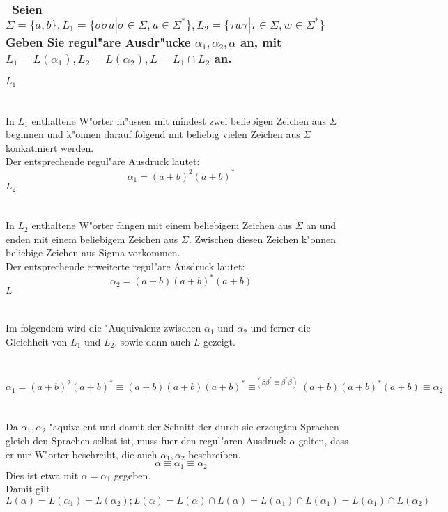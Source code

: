 \documentclass{article}
\newcommand{\gap}{\null\ \\ \\}
\newcommand{\task}[1]{\textbf{#1} \\ \gap}
\begin{document}
\subsubsection{\
    Seien $\Sigma = \{a,b\} 
        , L_1 = \{\sigma\sigma u | \sigma \in \Sigma, u \in \Sigma^*\}
        , L_2 = \{\tau w \tau | \tau \in \Sigma, w \in \Sigma^*\}$\\
    Geben Sie regul"are Ausdr"ucke $\alpha_1,\alpha_2,\alpha$ an, mit
        $L_1 = L(\alpha_1), L_2 = L(\alpha_2), L = L_1 \cap L_2$ an.
    }
\task{$L_1$}
In $L_1$ enthaltene W"orter m"ussen mit mindest zwei beliebigen Zeichen aus 
    $\Sigma$ beginnen und k"onnen darauf folgend mit beliebig vielen
    Zeichen aus $\Sigma$ konkatiniert werden.\\
Der entsprechende regul"are Ausdruck lautet:\[
    \alpha_1 = (a+b)^2 (a+b)^*
    \]
\task{$L_2$}
In $L_2$ enthaltene W"orter fangen mit einem beliebigem Zeichen aus $\Sigma$ an
    und enden mit einem beliebigem Zeichen aus $\Sigma$. Zwischen diesen Zeichen
    k"onnen beliebige Zeichen aus Sigma vorkommen.\\
Der entsprechende erweiterte regul"are Ausdruck lautet:\[
    \alpha_2 = (a+b)(a+b)^*(a+b)
    \]
\task{$L$}
Im folgendem wird die "Auquivalenz zwischen $\alpha_1$ und $\alpha_2$ und ferner
    die Gleichheit von $L_1$ und $L_2$, sowie dann auch $L$ gezeigt.\\
\gap
\[
    \alpha_1 = (a+b)^2(a+b)^*
        \equiv (a+b)(a+b)(a+b)^*
        \equiv^{(\beta \beta^* \equiv \beta^* \beta)} 
            (a+b)(a+b)^*(a+b)
        \equiv \alpha_2
    \]
\gap
Da $\alpha_1,\alpha_2$ "aquivalent und damit der Schnitt der durch sie erzeugten
    Sprachen gleich den Sprachen selbst ist, muss
    fuer den regul"aren Ausdruck $\alpha$ gelten, dass er nur W"orter
    beschreibt, die auch $\alpha_1,\alpha_2$ beschreiben.\[
    \alpha \equiv \alpha_1 \equiv \alpha_2
    \]
Dies ist etwa mit $\alpha = \alpha_1$ gegeben.\\
Damit gilt \[
    L(\alpha) = L(\alpha_1) = L(\alpha_2);
    L(\alpha )= L(\alpha) \cap L(\alpha)
        = L(\alpha_1) \cap L(\alpha_1)
        = L(\alpha_1) \cap L(\alpha_2) 
    \]
\end{document}
